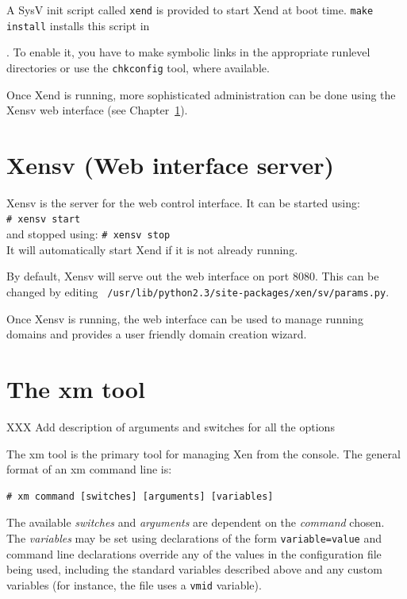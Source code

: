 \documentclass[11pt,twoside,final,openright]{xenstyle}
\begin{document}
A SysV init script called {\tt xend} is provided to start Xend at boot
time.  {\tt make install} installs this script in {.
To enable it, you have to make symbolic links in the appropriate
runlevel directories or use the {\tt chkconfig} tool, where available.

Once Xend is running, more sophisticated administration can be done
using the Xensv web interface (see Chapter~\ref{cha:xensv}).

\chapter{Xensv (Web interface server)}
\label{cha:xensv}

Xensv is the server for the web control interface.  It can be started
using:\\
\verb_# xensv start_ \\
and stopped using:
\verb_# xensv stop_ \\
It will automatically start Xend if it is not already running.

By default, Xensv will serve out the web interface on port 8080.  This
can be changed by editing {\tt
/usr/lib/python2.3/site-packages/xen/sv/params.py}.

Once Xensv is running, the web interface can be used to manage running
domains and provides a user friendly domain creation wizard.

\chapter{The xm tool}
\label{cha:xm}

XXX Add description of arguments and switches for all the options

The xm tool is the primary tool for managing Xen from the console.
The general format of an xm command line is:

\begin{verbatim}
# xm command [switches] [arguments] [variables]
\end{verbatim}

The available {\em switches } and {\em arguments} are dependent on the
{\em command} chosen.  The {\em variables} may be set using
declarations of the form {\tt variable=value} and command line
declarations override any of the values in the configuration file
being used, including the standard variables described above and any
custom variables (for instance, the  file uses a
{\tt vmid} variable).

}
\end{document}
